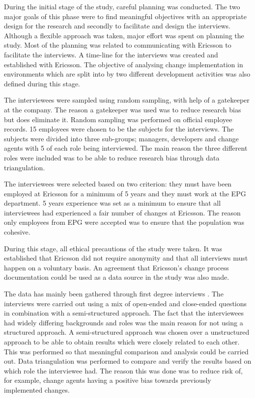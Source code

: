 \documentclass[10pt,twocolumn]{article}
\begin{document}
During the initial stage of the study, careful planning was conducted. The two major goals of this phase were to find meaningful objectives with an appropriate design for the research and secondly to facilitate and design the interviews. Although a flexible approach was taken, major effort was spent on planning the study. Most of the planning was related to communicating with Ericsson to facilitate the interviews. A time-line for the interviews was created and established with Ericsson. The objective of analysing change implementation in environments which are split into by two different development activities was also defined during this stage. 

The interviewees were sampled using random sampling, with help of a gatekeeper at the company. The reason a gatekeeper was used was to reduce research bias but does eliminate it. Random sampling was performed on official employee records. 15 employees were chosen to be the subjects for the interviews. The subjects were divided into three sub-groups; managers, developers and change agents with 5 of each role being interviewed. The main reason the three different roles were included was to be able to reduce research bias through data triangulation.

The interviewees were selected based on two criterion: they must have been employed at Ericsson for a minimum of 5 years and they must work at the EPG department. 5 years experience was set as a minimum to ensure that all interviewees had experienced a fair number of changes at Ericsson. The reason only employees from EPG were accepted was to ensure that the population was cohesive. 

During this stage, all ethical precautions of the study were taken. It was established that Ericsson did not require anonymity and that all interviews must happen on a voluntary basis. An agreement that Ericsson's change process documentation could be used as a data source in the study was also made. 

The data has mainly been gathered through first degree interviews \cite{lethbridge2005studying}. The interviews were carried out using a mix of open-ended and close-ended questions in combination with a semi-structured approach. The fact that the interviewees had widely differing backgrounds and roles was the main reason for not using a structured approach. A semi-structured approach was chosen over a unstructured approach to be able to obtain results which were closely related to each other. This was performed so that meaningful comparison and analysis could be carried out. Data triangulation was performed to compare and verify the results based on which role the interviewee had. The reason this was done was to reduce risk of, for example, change agents having a positive bias towards previously implemented changes. 
\end{document}
